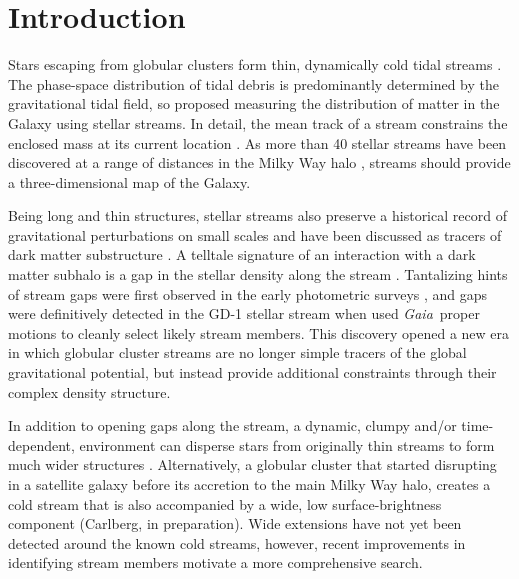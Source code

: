 \documentclass[twocolumn]{aastex62}
\newcommand{\gaia}{\textsl{Gaia}}
\begin{document}
\section{Introduction}
\label{sec:intro}

% 

Stars escaping from globular clusters form thin, dynamically cold tidal streams \citep[e.g.,][]{combes1999}.
The phase-space distribution of tidal debris is predominantly determined by the gravitational tidal field, so \citet{johnston1999} proposed measuring the distribution of matter in the Galaxy using stellar streams.
In detail, the mean track of a stream constrains the enclosed mass at its current location \citep{bh2018}.
As more than 40 stellar streams have been discovered at a range of distances in the Milky Way halo \citep[see][for a recent review]{gc2016}, streams should provide a three-dimensional map of the Galaxy.

Being long and thin structures, stellar streams also preserve a historical record of gravitational perturbations on small scales and have been discussed as tracers of dark matter substructure \citep[e.g.,][]{johnston2002, carlberg2009}.
A telltale signature of an interaction with a dark matter subhalo is a gap in the stellar density along the stream \citep[e.g.,][]{yoon2011, eb2015}.
Tantalizing hints of stream gaps were first observed in the early photometric surveys \citep[e.g.,][]{carlberg2012,cg2013}, and gaps were definitively detected in the GD-1 stellar stream \citep{gd2006} when \citet{pwb} used \gaia\ proper motions to cleanly select likely stream members.
This discovery opened a new era in which globular cluster streams are no longer simple tracers of the global gravitational potential, but instead provide additional constraints  through their complex density structure.

In addition to opening gaps along the stream, a dynamic, clumpy and/or time-dependent, environment can disperse stars from originally thin streams to form much wider structures \citep[e.g.,][]{bonaca2014, ngan2016, pw2016, pearson2017}.
Alternatively, a globular cluster that started disrupting in a satellite galaxy before its accretion to the main Milky Way halo, creates a cold stream that is also accompanied by a wide, low surface-brightness component (Carlberg, in preparation).
Wide extensions have not yet been detected around the known cold streams, however, recent improvements in identifying stream members motivate a more comprehensive search.
\end{document}
